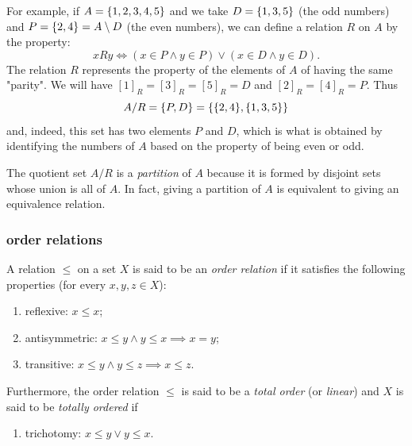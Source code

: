 For example, if $A={\left\{ 1,2,3,4,5 \right\}}$ and we take $D={\left\{ 1,3,5 \right\}}$ (the odd
numbers) and $P={\left\{ 2,4 \right\}}=A\setminus D$ (the even numbers), we can define a
relation $R$ on $A$ by the property:
\[
 x R  y \iff (x\in P \land y\in P) \lor (x\in D \land y\in D).
\]
The relation $R$ represents the property of the elements of $A$ of having the
same "parity". We will have $[1]_R = [3]_R=[5]_R= D$ and $[2]_R=[4]_R=P$. Thus
\[
   A/R = {\left\{ P,D \right\}} = {\left\{ {\left\{ 2,4 \right\}},{\left\{ 1,3,5 \right\}} \right\}}
\]
and, indeed, this set has two elements $P$ and $D$, which is what is obtained by
identifying the numbers of $A$ based on the property of being even or odd.

The quotient set $A/R$ is a \emph{partition}%
%
 of $A$ because it is formed by disjoint sets whose union is all of $A$. In fact, giving a partition of $A$ is equivalent to giving an equivalence relation.

\subsubsection{order relations}

\begin{definition}
  \label{def:ordine}%
  A relation
  $\le$ on a set $X$ is said to be an
  \emph{order relation}%
%
  if it satisfies the following properties (for every $x,y,z\in X$):
  \begin{enumerate}
    \item[1.] reflexive: $x\le x$;
    \item[2.] antisymmetric: $x\le y \land y\le x \implies x=y$;
    \item[3.] transitive: $x\le y \land y\le z \implies x\le z$.
  \end{enumerate}
  Furthermore, the order relation $\le$
  is said to be a \emph{total order}%
%
  (or \emph{linear}) 
  and $X$ is said to be \emph{totally ordered} if
  \begin{enumerate}
    \item[4.] trichotomy: $x\le y \lor y\le x$.
  \end{enumerate}
\end{definition}

